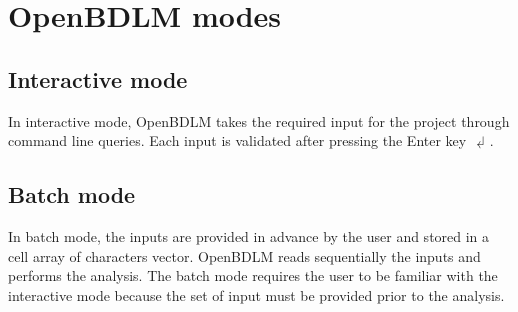 \section{OpenBDLM modes}
\label{S:OPENBDLMRUNNINGMODES}

\subsection{Interactive mode}
\label{SS:InteractiveMode}

In interactive mode, OpenBDLM takes the required input for the project through \MATLAB{} command line queries.
Each input is validated after pressing the Enter key $\dlsh$.

\subsection{Batch mode}
\label{SS:Batchmode}

In batch mode, the inputs are provided in advance by the user and stored in a cell array of characters vector.
OpenBDLM reads sequentially the inputs and performs the analysis.  %
The batch mode requires the user to be familiar with the interactive mode because the set of input must be provided prior to the analysis.